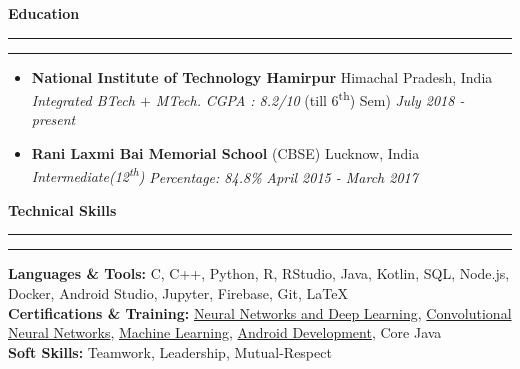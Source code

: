 \documentclass[11pt]{article}
\begin{document}
    \textbf{\large{Education}}
    	\vspace{5pt}
    	\hrule \hrule
    	\vspace{-4pt}
    	\begin{itemize}
    		\setlength{\itemsep}{4pt}
        	\setlength{\parskip}{0pt}
        	\setlength{\parsep}{4pt}
        	\item \textbf{National Institute of Technology Hamirpur} \hfill Himachal Pradesh, India\\
        	\textsl{Integrated BTech $+$ MTech.} \textit{CGPA : 8.2/10}  (till 6\textsuperscript{th}) Sem)
        	\hfill 
        	\textit{July 2018 - present}
        	\item \textbf{Rani Laxmi Bai Memorial School} (CBSE) \hfill Lucknow, India\\
        	\textsl{Intermediate(12\textsuperscript{th}) } \textit{Percentage: 84.8\%}  \hfill 
        	\textit{April 2015 - March 2017}
    	\end{itemize}
    \vspace{2pt}
    \textbf{Technical Skills}
    	\vspace{5pt}
    	\hrule \hrule
    	\vspace{4pt}
    	\textbf{Languages \& Tools:} C, C++, Python, R, RStudio, Java, Kotlin, SQL, Node.js, Docker, Android Studio, Jupyter, Firebase, Git, \LaTeX\\
        \textbf{Certifications \& Training:} \href{https://drive.google.com/file/d/1mir_TBy9GinXpSU3H-8LyYn68GkcM62f/view?usp=sharing}{Neural Networks and Deep Learning}, \href{https://drive.google.com/file/d/18cQMPfNLtvY4-Ozh7hZnUIDKYh9tRYPG/view?usp=sharing}{Convolutional Neural Networks}, \href{https://drive.google.com/file/d/13L4JKQ1pwLG9YVevPVZLNRLUeZWGkvyU/view?usp=sharing}{Machine Learning}, \href{https://drive.google.com/file/d/1Hp5dvhNVz9FvjQ6Y4vIVZldKpb8m8LCp/view?usp=sharing}{Android Development}, Core Java\\
        \textbf{Soft Skills:} Teamwork, Leadership, Mutual-Respect\\
   
\end{document}
